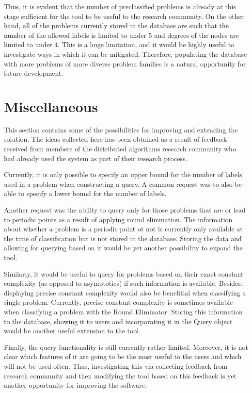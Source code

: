 Thus, it is evident that the number of preclassified problems is already at this stage sufficient
for the tool to be useful to the research community.
On the other hand, all of the problems currently stored in the database are such
that the number of the allowed labels is limited to under 5 and degrees of the nodes
are limited to under 4. This is a huge limitation, and it would be
highly useful to investigate ways in which it can be mitigated.
Therefore, populating the database
with more problems of more diverse problem families is a natural opportunity for future
development.

\section{Miscellaneous}

This section contains some of the possibilities
for improving and extending the solution. The ideas collected
here has been obtained as a result of feedback
received from members of the distributed algorithms
research community who had already used the system
as part of their research process.

Currently, it is only possible to specify an upper bound for
the number of labels used in a problem when constructing a query.
A common request was to also be able to specify a lower bound for the
number of labels.

Another request was the ability to query only for those problems that are
or lead to periodic points as a result of applying round elimination.
The information about whether a problem is a periodic point ot not
is currently only available at the time of classification but is
not stored in the database. Storing the data and allowing for
querying based on it would be yet another possibility to expand the tool.

Similarly, it would be useful to query for problems based on their
exact constant complexity (as opposed to asymptotics) if such
information is available. Besides, displaying precise constant complexity
would also be benefitial when classifying a single problem.
Currently, precise constant complexity is sometimes available when
classifying a problem with the Round Eliminator. Storing this
information to the database, showing it to users and incorporating it
in the Query object would be another useful extension to the tool.

Finally, the query functionality is still currently rather limited.
Moreover, it is not clear which features of it are going to be the
most useful to the users and which will not be used often.
Thus, investigating this via collecting feedback from
research community and then modifying the tool based on
this feedback is yet another opportunity for improving the software.

